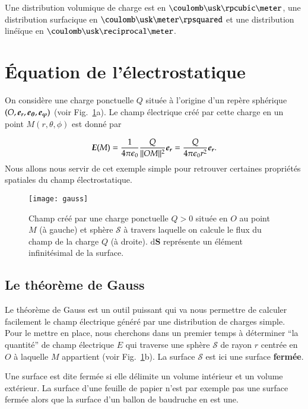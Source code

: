 \begin{attention}
	Une distribution volumique de charge est en $\coulomb \usk \rpcubic \meter$,
	une distribution surfacique en $\coulomb \usk \meter \rpsquared$
	et une distribution linéïque en $\coulomb \usk \reciprocal \meter$.
\end{attention}

\section{Équation de l'électrostatique}
On considère une charge ponctuelle $Q$ située à l'origine d'un repère sphérique
$(O, \er, \etheta, \ephi)$ (voir Fig.~\ref{fig:gauss}a). Le champ électrique créé 
par cette charge en 
un point $M(r, \theta, \phi)$ est donné par

\begin{equation*}
	\vece(M) = \pieps \dfrac{Q}{||OM||^2}\er 
	         = \dfrac{Q}{4\pi\epsilon_0 r^2}\er.
\end{equation*}
Nous allons nous servir de cet exemple simple pour retrouver certaines propriétés
spatiales du champ électrostatique.

\begin{figure}
	\centering
	\texttt{[image: gauss]}
	\caption{Champ créé par une charge ponctuelle $Q > 0$ située en 
		 $O$ au point $M$ (à gauche) et sphère $\mathcal{S}$ à travers
	 	 laquelle on calcule le flux du champ de la charge $Q$ (à droite).
	         $\mathrm{d}\mathbf{S}$ représente un élément infinitésimal 
	 	 de la surface.}%
	\label{fig:gauss}
\end{figure}

\subsection{Le théorème de Gauss}
\label{sec:gauss}
Le théorème de Gauss est un outil puissant qui va nous permettre de calculer
facilement le champ électrique généré par une distribution de charges simple.
Pour le mettre en place, nous
cherchons dans un premier temps à déterminer ``la quantité'' de champ électrique 
$E$ qui traverse une
sphère $\mathcal{S}$ de rayon $r$ centrée en $O$ à laquelle $M$ 
appartient (voir Fig.~\ref{fig:gauss}b). 
La surface $\mathcal{S}$ est ici une surface \textbf{fermée}.

\begin{defn}
	Une surface est dite fermée si elle délimite un volume intérieur 
	et un volume extérieur. La surface d'une feuille de papier n'est par 
	exemple pas une surface fermée alors que la surface d'un ballon de baudruche
	en est une.
\end{defn}

